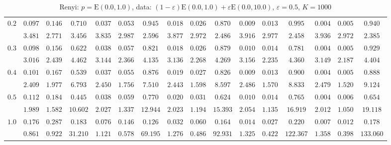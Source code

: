 \begin{table}[ht]
\begin{center}
\begin{tabular}{|c|ccc|ccc|ccc|ccc|ccc|}
\hline 
$0.2$ & $ 0.097 $ & $ 0.146 $ & $ 0.710 $ & $ 0.037 $ & $ 0.053 $ & $ 0.945 $ & $ 0.018 $ & $ 0.026 $ & $ 0.870 $ & $ 0.009 $ & $ 0.013 $ & $ 0.995 $ & $ 0.004 $ & $ 0.005 $ & $ 0.940 $\\ 
 & $ 3.481 $ & $ 2.771 $ & $ 3.456 $ & $ 3.835 $ & $ 2.987 $ & $ 2.596 $ & $ 3.877 $ & $ 2.972 $ & $ 2.486 $ & $ 3.916 $ & $ 2.977 $ & $ 2.458 $ & $ 3.936 $ & $ 2.972 $ & $ 2.385 $\\ 
\hline 
$0.3$ & $ 0.098 $ & $ 0.156 $ & $ 0.622 $ & $ 0.038 $ & $ 0.057 $ & $ 0.821 $ & $ 0.018 $ & $ 0.026 $ & $ 0.879 $ & $ 0.010 $ & $ 0.014 $ & $ 0.781 $ & $ 0.004 $ & $ 0.005 $ & $ 0.929 $\\ 
 & $ 3.016 $ & $ 2.439 $ & $ 4.462 $ & $ 3.144 $ & $ 2.366 $ & $ 4.135 $ & $ 3.136 $ & $ 2.268 $ & $ 4.269 $ & $ 3.156 $ & $ 2.235 $ & $ 4.360 $ & $ 3.149 $ & $ 2.187 $ & $ 4.404 $\\ 
\hline 
$0.4$ & $ 0.101 $ & $ 0.167 $ & $ 0.539 $ & $ 0.037 $ & $ 0.055 $ & $ 0.876 $ & $ 0.019 $ & $ 0.027 $ & $ 0.826 $ & $ 0.009 $ & $ 0.013 $ & $ 0.900 $ & $ 0.004 $ & $ 0.005 $ & $ 0.888 $\\ 
 & $ 2.409 $ & $ 1.977 $ & $ 6.793 $ & $ 2.450 $ & $ 1.756 $ & $ 7.510 $ & $ 2.443 $ & $ 1.598 $ & $ 8.597 $ & $ 2.486 $ & $ 1.570 $ & $ 8.833 $ & $ 2.479 $ & $ 1.520 $ & $ 9.124 $\\ 
\hline 
$0.5$ & $ 0.112 $ & $ 0.184 $ & $ 0.445 $ & $ 0.038 $ & $ 0.059 $ & $ 0.770 $ & $ 0.020 $ & $ 0.031 $ & $ 0.624 $ & $ 0.010 $ & $ 0.014 $ & $ 0.765 $ & $ 0.004 $ & $ 0.006 $ & $ 0.654 $\\ 
 & $ 1.989 $ & $ 1.582 $ & $ 10.602 $ & $ 2.027 $ & $ 1.337 $ & $ 12.944 $ & $ 2.023 $ & $ 1.194 $ & $ 15.393 $ & $ 2.054 $ & $ 1.135 $ & $ 16.919 $ & $ 2.012 $ & $ 1.050 $ & $ 19.118 $\\ 
\hline 
$1.0$ & $ 0.176 $ & $ 0.287 $ & $ 0.183 $ & $ 0.076 $ & $ 0.146 $ & $ 0.126 $ & $ 0.032 $ & $ 0.060 $ & $ 0.164 $ & $ 0.014 $ & $ 0.027 $ & $ 0.220 $ & $ 0.007 $ & $ 0.012 $ & $ 0.178 $\\ 
 & $ 0.861 $ & $ 0.922 $ & $ 31.210 $ & $ 1.121 $ & $ 0.578 $ & $ 69.195 $ & $ 1.276 $ & $ 0.486 $ & $ 92.931 $ & $ 1.325 $ & $ 0.422 $ & $ 122.367 $ & $ 1.358 $ & $ 0.398 $ & $ 133.060 $\\ 
\hline 
\end{tabular}
\caption{Renyi: $p = \mathrm{E}(0.0,1.0)$, data: $(1-\varepsilon)\mathrm{E}(0.0,1.0) + \varepsilon \mathrm{E}(0.0,10.0)$, $\varepsilon =  0.5$, $K = 1000$} 
\end{center}
\end{table}
%
